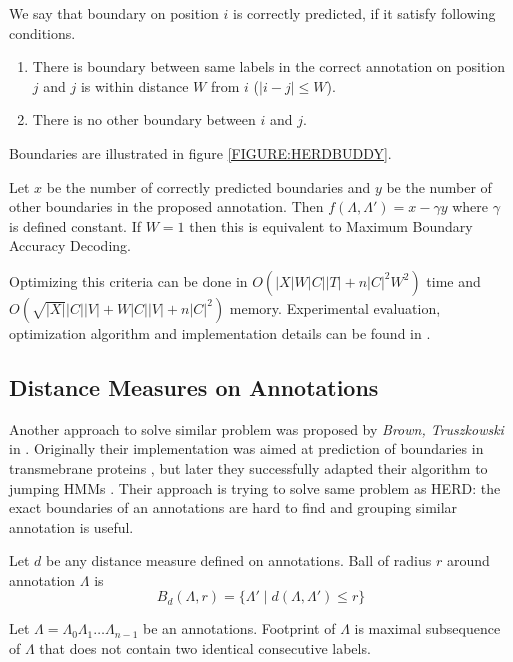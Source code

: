 We say that boundary on position $i$ is correctly predicted, if it satisfy
following conditions.
\begin{enumerate}
\item There is boundary between same labels in the correct annotation on position $j$ and $j$ is
within distance $W$ from $i$ ($|i-j|\leq W$).
\item There is no other boundary between $i$ and $j$. 
\end{enumerate}
Boundaries are illustrated in figure \ref{FIGURE:HERDBUDDY}. 

Let $x$ be the number of correctly
predicted boundaries and $y$ be the number of other boundaries in the proposed
annotation. Then $f(\Lambda,\Lambda')=x-\gamma y$ where $\gamma$ is defined
constant. If $W=1$ then this is equivalent to Maximum Boundary Accuracy
Decoding. 

Optimizing this criteria can be done in $O(|X|W|C||T| + n|C|^2W^2)$ time  and
$O(\sqrt{|X|}|C||V|+W|C||V|+n|C|^2)$ memory. Experimental evaluation,
optimization algorithm and implementation details can be found in
\cite{Nanasi2010mgr}.

\subsection{Distance Measures on Annotations}

Another approach to solve similar problem was proposed by {\it Brown,
Truszkowski} in \cite{Brown2010}. Originally their implementation was aimed at
prediction of boundaries in transmebrane proteins \cite{Brown2010}, but later
they successfully adapted their algorithm to jumping HMMs \cite{Truszkowski2011}.
Their approach is trying to solve same problem as HERD: the exact boundaries of
an annotations are hard to find and grouping similar annotation is useful.

\begin{definition}
Let $d$ be any distance measure defined on annotations. Ball of radius $r$
around annotation $\Lambda$ is 
\begin{equation*}
B_d(\Lambda,r) = \{\Lambda'\mid d(\Lambda,\Lambda')\leq r\}
\end{equation*}
\end{definition}

\begin{definition}
Let $\Lambda=\Lambda_0\Lambda_1\dots\Lambda_{n-1}$ be an annotations. Footprint
of $\Lambda$ is maximal subsequence of $\Lambda$ that does not contain two
identical 
consecutive labels.
\end{definition}

